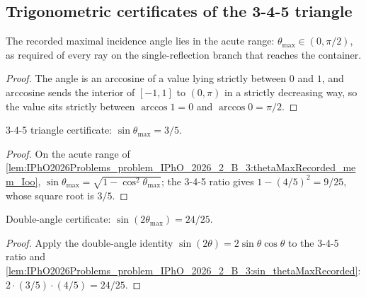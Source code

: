 \subsection*{Trigonometric certificates of the 3-4-5 triangle}

\begin{lemma}
\label{lem:IPhO2026Problems_problem_IPhO_2026_2_B_3:thetaMaxRecorded_mem_Ioo}
The recorded maximal incidence angle lies in the acute range:
$\theta_{\max} \in (0, \pi/2)$, as required of every ray on the
single-reflection branch that reaches the container.
\end{lemma}
\begin{proof}
The angle is an arccosine of a value lying strictly between $0$ and $1$, and
arccosine sends the interior of $[-1, 1]$ to $(0, \pi)$ in a strictly
decreasing way, so the value sits strictly between $\arccos 1 = 0$ and
$\arccos 0 = \pi/2$.
\end{proof}

\begin{lemma}
\label{lem:IPhO2026Problems_problem_IPhO_2026_2_B_3:sin_thetaMaxRecorded}
3-4-5 triangle certificate:
$\sin\theta_{\max} = 3/5$.
\end{lemma}
\begin{proof}
On the acute range of
\cref{lem:IPhO2026Problems_problem_IPhO_2026_2_B_3:thetaMaxRecorded_mem_Ioo},
$\sin\theta_{\max} = \sqrt{1 - \cos^2\theta_{\max}}$; the 3-4-5 ratio gives
$1 - (4/5)^2 = 9/25$, whose square root is $3/5$.
\end{proof}

\begin{lemma}
\label{lem:IPhO2026Problems_problem_IPhO_2026_2_B_3:sin_two_mul_thetaMaxRecorded}
Double-angle certificate: $\sin(2\theta_{\max}) = 24/25$.
\end{lemma}
\begin{proof}
Apply the double-angle identity $\sin(2\theta) = 2\sin\theta\cos\theta$ to the
3-4-5 ratio and
\cref{lem:IPhO2026Problems_problem_IPhO_2026_2_B_3:sin_thetaMaxRecorded}:
$2 \cdot (3/5) \cdot (4/5) = 24/25$.
\end{proof}

